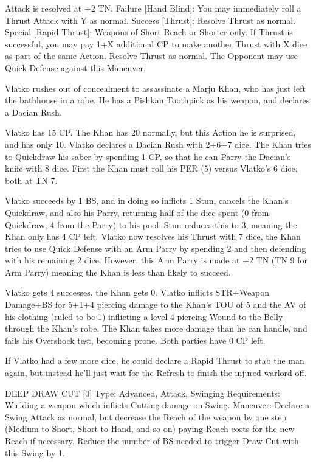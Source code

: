 \documentclass[oneside,11pt,english]{book}
\begin{document}
Attack is resolved at +2 TN. 
Failure [Hand Blind]: You may immediately roll a Thrust Attack with Y as normal. 
Success [Thrust]: Resolve Thrust as normal. 
Special [Rapid Thrust]: Weapons of Short Reach or Shorter only. If Thrust is successful, you may pay 
1+X additional CP to make another Thrust with X dice as part of the same Action. Resolve Thrust as 
normal. The Opponent may use Quick Defense against this Maneuver. 

 
Vlatko rushes out of concealment to assassinate a Marju Khan, who has just left the bathhouse in a robe. He has a Pishkan 
Toothpick as his weapon, and declares a Dacian Rush. 
 
Vlatko has 15 CP. The Khan has 20 normally, but this Action he is surprised, and has only 10. Vlatko declares a Dacian Rush 
with 2+6+7 dice. The Khan tries to Quickdraw his saber by spending 1 CP, so that he can Parry the Dacian's knife with 8 dice. 
First the Khan must roll his PER (5) versus Vlatko's 6 dice, both at TN 7. 
 
Vlatko succeeds by 1 BS, and in doing so inflicts 1 Stun, cancels the Khan's Quickdraw, and also his Parry, returning half of the 
dice spent (0 from Quickdraw, 4 from the Parry) to his pool. Stun reduces this to 3, meaning the Khan only has 4 CP left. Vlatko 
now resolves his Thrust with 7 dice, the Khan tries to use Quick Defense with an Arm Parry by spending 2 and then defending 
with his remaining 2 dice. However, this Arm Parry is made at +2 TN (TN 9 for Arm Parry) meaning the Khan is less than likely 
to succeed. 
 
Vlatko gets 4 successes, the Khan gets 0. Vlatko inflicts STR+Weapon Damage+BS for 5+1+4 piercing damage to the Khan’s 
TOU of 5 and the AV of his clothing (ruled to be 1) inflicting a level 4 piercing Wound to the Belly through the Khan's robe. The 
Khan takes more damage than he can handle, and fails his Overshock test, becoming prone. Both parties have 0 CP left. 
 
If Vlatko had a few more dice, he could declare a Rapid Thrust to stab the man again, but instead he'll just wait for the Refresh to 
finish the injured warlord off. 
 
DEEP DRAW CUT [0] 
Type: Advanced, Attack, Swinging 
Requirements: Wielding a weapon which inflicts Cutting damage on Swing. 
Maneuver: Declare a Swing Attack as normal, but decrease the Reach of the weapon by one step 
(Medium to Short, Short to Hand, and so on) paying Reach costs for the new Reach if necessary. Reduce 
the number of BS needed to trigger Draw Cut with this Swing by 1. 
\end{document}
